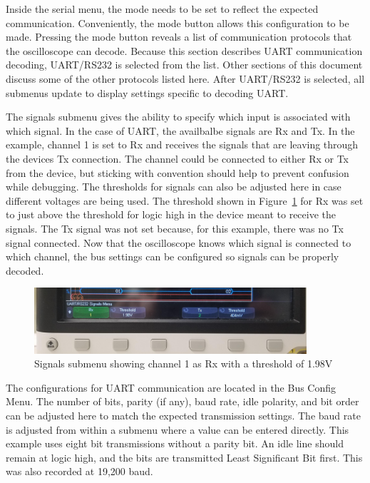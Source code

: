 \documentclass{article}
\begin{document}
  Inside the serial menu, the mode needs to be set to reflect the expected
  communication. Conveniently, the mode button allows this configuration to be
  made. Pressing the mode button reveals a list of communication protocols that
  the oscilloscope can decode. Because this section describes UART communication
  decoding, UART/RS232 is selected from the list. Other sections of this
  document discuss some of the other protocols listed here. After UART/RS232 is
  selected, all submenus update to display settings
  specific to decoding UART.\@

  The signals submenu gives the ability to specify which input is associated
  with which signal. In the case of UART, the availbalbe signals are Rx and Tx.
  In the example, channel 1 is set to Rx and receives the signals that are
  leaving through the devices Tx connection. The channel could be connected to
  either Rx or Tx from the device, but sticking with convention should help to
  prevent confusion while debugging. The thresholds for signals can also be
  adjusted here in case different voltages are being used. The threshold shown
  in Figure~\ref{fig:uart_signals_menu} for Rx was set to just above the threshold
  for logic high in the device meant to receive the signals. The Tx signal was
  not set because, for this example, there was no Tx signal connected. Now that
  the oscilloscope knows which signal is connected to which channel, the bus
  settings can be configured so signals can be properly decoded.

  \begin{figure}[h]
    \centering
    \includegraphics[width=0.9\textwidth]{images/uart/signals_menu.jpg}
    \caption{Signals submenu showing channel 1 as Rx with a threshold of 1.98V}
    \label{fig:uart_signals_menu}
  \end{figure}

  The configurations for UART communication are located in the Bus Config Menu.
  The number of bits, parity (if any), baud rate, idle polarity, and bit order
  can be adjusted here to match the expected transmission settings. The baud
  rate is adjusted from within a submenu where a value can be entered directly.
  This example uses eight bit transmissions without a parity bit. An idle line
  should remain at logic high, and the bits are transmitted Least Significant
  Bit first. This was also recorded at 19,200 baud.
\end{document}
